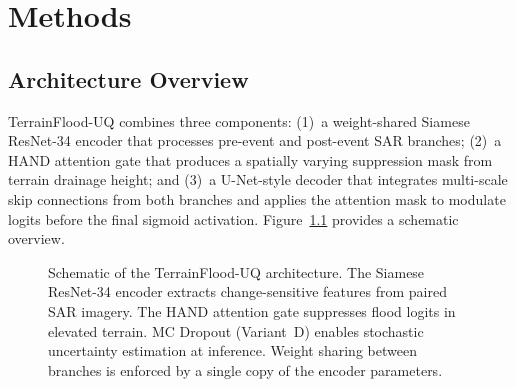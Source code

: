\documentclass[12pt,oneside]{report}
\begin{document}
\chapter{Methods}
\label{ch:methods}

\section{Architecture Overview}

TerrainFlood-UQ combines three components: (1)~a weight-shared Siamese
ResNet-34 encoder that processes pre-event and post-event SAR branches;
(2)~a HAND attention gate that produces a spatially varying suppression mask
from terrain drainage height; and (3)~a U-Net-style decoder that integrates
multi-scale skip connections from both branches and applies the attention mask
to modulate logits before the final sigmoid activation.
Figure~\ref{fig:architecture} provides a schematic overview.

\begin{figure}[htbp]
\centering
\setlength{\fboxsep}{8pt}
\caption{Schematic of the TerrainFlood-UQ architecture.  The Siamese
ResNet-34 encoder extracts change-sensitive features from paired SAR imagery.
The HAND attention gate suppresses flood logits in elevated terrain.
MC Dropout (Variant~D) enables stochastic uncertainty estimation at inference.
Weight sharing between branches is enforced by a single copy of the encoder
parameters.}
\label{fig:architecture}
\end{figure}
\end{document}
